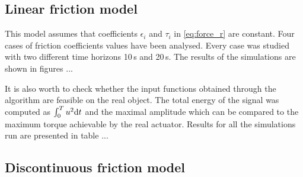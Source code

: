 \subsection{Linear friction model}
This model assumes that coefficients $\epsilon_i$ and $\tau_i$ in \eqref{eq:force_r} are constant. Four cases of friction coefficients values have been analysed. Every case was studied with two different time horizons 10\,s and 20\,s. The results of the simulations are shown in figures ...

It is also worth to check whether the input functions obtained through the algorithm are feasible on the real object. The total energy of the signal was computed as $\int_0^T u^2\mathrm{d} t$ and the maximal amplitude which can be compared to the maximum torque achievable by the real actuator. Results for all the simulations run are presented in table ...



\subsection{Discontinuous friction model}
